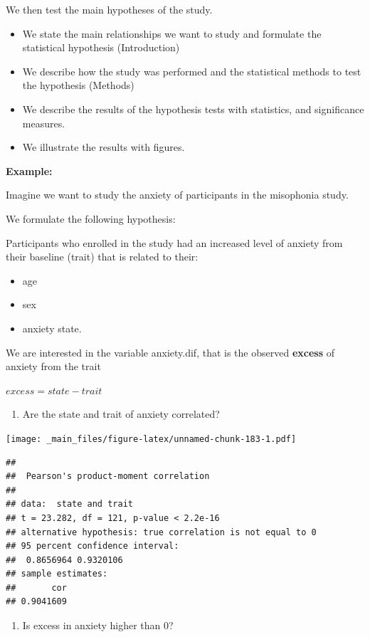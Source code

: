 \documentclass[
]{book}
\providecommand{\tightlist}{%
  \setlength{\itemsep}{0pt}\setlength{\parskip}{0pt}}
\begin{document}
We then test the main hypotheses of the study.

\begin{itemize}
\item
  We state the main relationships we want to study and formulate the statistical hypothesis (Introduction)
\item
  We describe how the study was performed and the statistical methods to test the hypothesis (Methods)
\item
  We describe the results of the hypothesis tests with statistics, and significance measures.
\item
  We illustrate the results with figures.
\end{itemize}

\textbf{Example:}

Imagine we want to study the anxiety of participants in the misophonia study.

We formulate the following hypothesis:

Participants who enrolled in the study had an increased level of anxiety from their baseline (trait) that is related to their:

\begin{itemize}
\tightlist
\item
  age
\item
  sex
\item
  anxiety state.
\end{itemize}

We are interested in the variable anxiety.dif, that is the observed \textbf{excess} of anxiety from the trait

\(excess = state - trait\)

\begin{enumerate}
\def\labelenumi{\arabic{enumi}.}
\tightlist
\item
  Are the state and trait of anxiety correlated?
\end{enumerate}

\texttt{[image: \_main\_files/figure-latex/unnamed-chunk-183-1.pdf]}

\begin{verbatim}
## 
##  Pearson's product-moment correlation
## 
## data:  state and trait
## t = 23.282, df = 121, p-value < 2.2e-16
## alternative hypothesis: true correlation is not equal to 0
## 95 percent confidence interval:
##  0.8656964 0.9320106
## sample estimates:
##       cor 
## 0.9041609
\end{verbatim}

\begin{enumerate}
\def\labelenumi{\arabic{enumi}.}
\setcounter{enumi}{1}
\tightlist
\item
  Is excess in anxiety higher than \(0\)?
\end{enumerate}
\end{document}
